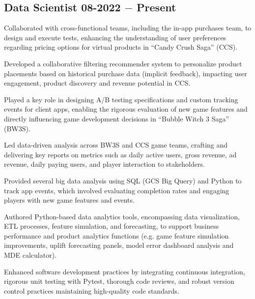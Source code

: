 \subsection{{Data Scientist \hfill 08-2022 $-$ Present}}
\begin{zitemize}
\item Collaborated with cross-functional teams, including the in-app purchases team, to design and execute tests, enhancing the understanding of user preferences regarding pricing options for virtual products in ``Candy Crush Saga'' (CCS).
\item Developed a collaborative filtering recommender system to personalize product placements based on historical purchase data (implicit feedback), impacting user engagement, product discovery and revenue potential in CCS.
\item Played a key role in designing A/B testing specifications and custom tracking events for client apps, enabling the rigorous evaluation of new game features and directly influencing game development decisions in ``Bubble Witch 3 Saga'' (BW3S).
\item Led data-driven analysis across BW3S and CCS game teams, crafting and delivering key reports on metrics such as daily active users, gross revenue, ad revenue, daily paying users, and player interaction to stakeholders.
\item Provided several big data analysis using SQL (GCS Big Query) and Python to track app events, which involved evaluating completion rates and engaging players with new game features and events.
\item Authored Python-based data analytics tools, encompassing data visualization, ETL processes, feature simulation, and forecasting, to support business performance and product analytics functions (e.g. game feature simulation improvements, uplift forecasting panels, model error dashboard analysis and MDE calculator).
\item Enhanced software development practices by integrating continuous integration, rigorous unit testing with Pytest, thorough code reviews, and robust version control practices maintaining high-quality code standards.
\end{zitemize}



